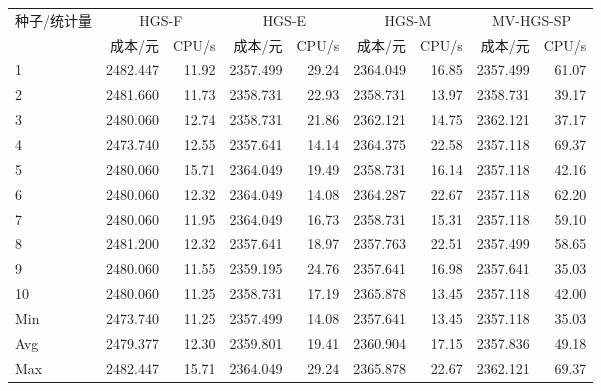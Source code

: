 \begin{tabular}{@{}lrrrrrrrr@{}}
\toprule
种子/统计量 & \multicolumn{2}{c}{HGS-F} & \multicolumn{2}{c}{HGS-E} & \multicolumn{2}{c}{HGS-M} & \multicolumn{2}{c}{MV-HGS-SP}\\
 & 成本/元 & CPU/s & 成本/元 & CPU/s & 成本/元 & CPU/s & 成本/元 & CPU/s\\
\midrule
1 & 2482.447 & 11.92 & 2357.499 & 29.24 & 2364.049 & 16.85 & 2357.499 & 61.07 \\
2 & 2481.660 & 11.73 & 2358.731 & 22.93 & 2358.731 & 13.97 & 2358.731 & 39.17 \\
3 & 2480.060 & 12.74 & 2358.731 & 21.86 & 2362.121 & 14.75 & 2362.121 & 37.17 \\
4 & 2473.740 & 12.55 & 2357.641 & 14.14 & 2364.375 & 22.58 & 2357.118 & 69.37 \\
5 & 2480.060 & 15.71 & 2364.049 & 19.49 & 2358.731 & 16.14 & 2357.118 & 42.16 \\
6 & 2480.060 & 12.32 & 2364.049 & 14.08 & 2364.287 & 22.67 & 2357.118 & 62.20 \\
7 & 2480.060 & 11.95 & 2364.049 & 16.73 & 2358.731 & 15.31 & 2357.118 & 59.10 \\
8 & 2481.200 & 12.32 & 2357.641 & 18.97 & 2357.763 & 22.51 & 2357.499 & 58.65 \\
9 & 2480.060 & 11.55 & 2359.195 & 24.76 & 2357.641 & 16.98 & 2357.641 & 35.03 \\
10 & 2480.060 & 11.25 & 2358.731 & 17.19 & 2365.878 & 13.45 & 2357.118 & 42.00 \\
Min & 2473.740 & 11.25 & 2357.499 & 14.08 & 2357.641 & 13.45 & 2357.118 & 35.03 \\
Avg & 2479.377 & 12.30 & 2359.801 & 19.41 & 2360.904 & 17.15 & 2357.836 & 49.18 \\
Max & 2482.447 & 15.71 & 2364.049 & 29.24 & 2365.878 & 22.67 & 2362.121 & 69.37 \\
\bottomrule
\end{tabular}
